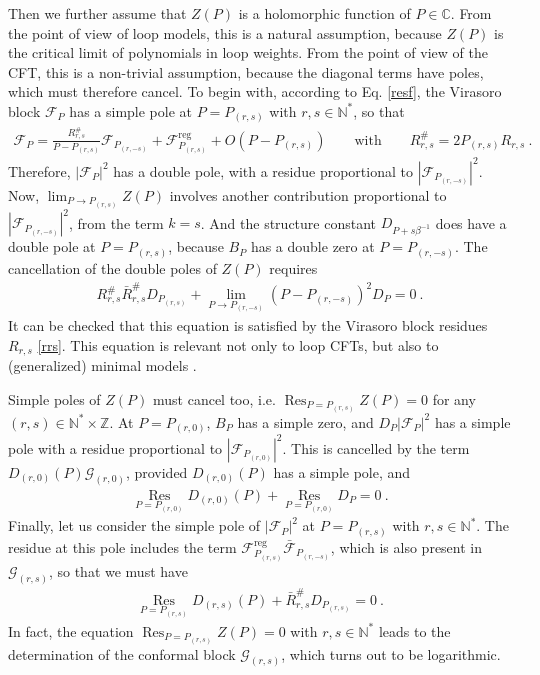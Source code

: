 \documentclass[12pt, a4paper]{article}
\theoremstyle{break}
\begin{document}
Then we further assume that $Z(P)$ is a holomorphic function of $P\in\mathbb{C}$. From the point of view of loop models, this is a natural assumption, because $Z(P)$ is the critical limit of polynomials in loop weights. From the point of view of the CFT, this is a non-trivial assumption, because the diagonal terms have poles, which must therefore cancel. 
To begin with, according to Eq. \eqref{resf}, the Virasoro block $\mathcal{F}_P$ has a simple pole at $P=P_{(r,s)}$ with $r,s\in \mathbb{N}^*$, so that 
\begin{align}
 \mathcal{F}_P = \frac{R^{\#}_{r,s}}{P-P_{(r,s)}} \mathcal{F}_{P_{(r,-s)}} + \mathcal{F}^\text{reg}_{P_{(r,s)}} + O(P-P_{(r,s)}) \qquad \text{with} \qquad R^{\#}_{r,s} = 2P_{(r,s)}R_{r,s}\ .
 \label{freg}
\end{align}
Therefore, $\left|\mathcal{F}_P\right|^2$ has a double pole, with a residue proportional to $\left|\mathcal{F}_{P_{(r,-s)}}\right|^2$. Now, $\lim_{P\to P_{(r,s)}} Z(P)$ involves another contribution proportional to $\left|\mathcal{F}_{P_{(r,-s)}}\right|^2$, from the term $k=s$. And the structure constant $D_{P+s\beta^{-1}}$ does have a double pole at $P=P_{(r,s)}$, because $B_P$ has a double zero at $P=P_{(r,-s)}$. The cancellation of the double poles of $Z(P)$ requires 
\begin{align}
 R^{\#}_{r,s}\bar{R}^{\#}_{r,s}D_{P_{(r,s)}} + \lim_{P\to P_{(r,-s)}}\left(P-P_{(r,-s)}\right)^2 D_P = 0 \ .
 \label{dpld}
\end{align}
It can be checked that this equation is satisfied by the Virasoro block residues $R_{r,s}$ \eqref{rrs}. This equation is relevant not only to loop CFTs, but also to (generalized) minimal models \cite{rib18}.

Simple poles of $Z(P)$ must cancel too, i.e. $\operatorname{Res}_{P=P_{(r,s)}}Z(P)=0$ for any $(r,s)\in \mathbb{N}^*\times\mathbb{Z}$. At $P=P_{(r,0)}$, $B_P$ has a simple zero, and $D_P\left|\mathcal{F}_P\right|^2$ has a simple pole with a residue proportional to $\left|\mathcal{F}_{P_{(r,0)}}\right|^2$. This is  cancelled by the term $D_{(r,0)}(P) \mathcal{G}_{(r,0)}$, provided $D_{(r,0)}(P)$ has a simple pole, and 
\begin{align}
  \underset{P=P_{(r,0)}}{\operatorname{Res}} D_{(r,0)}(P) + \underset{P=P_{(r,0)}}{\operatorname{Res}}D_P = 0 \ .
\end{align}
Finally, let us consider the simple pole of $\left|\mathcal{F}_{P}\right|^2$ at $P=P_{(r,s)}$ with $r,s\in \mathbb{N}^*$. The residue at this pole includes the term 
$\mathcal{F}_{P_{(r,s)}}^\text{reg}\bar{\mathcal{F}}_{P_{(r,-s)}}$, which is also present in $\mathcal{G}_{(r,s)}$, so that we must have 
\begin{align}
 \underset{P=P_{(r,s)}}{\operatorname{Res}} D_{(r,s)}(P) + \bar R^{\#}_{r,s} D_{P_{(r,s)}} = 0\ .
 \label{rdp}
\end{align}
In fact, the equation $\operatorname{Res}_{P=P_{(r,s)}}Z(P)=0$ with $r,s\in \mathbb{N}^*$ leads to the determination of the conformal block $\mathcal{G}_{(r,s)}$, which turns out to be logarithmic. 
\end{document}
